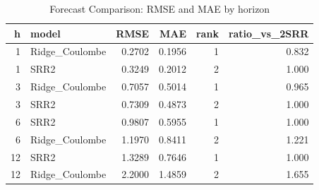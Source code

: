 \begin{table}[ht]
\centering
\caption{Forecast Comparison: RMSE and MAE by horizon} 
\label{tab:forecast_comparison}
\begin{tabular}{rlrrrr}
  \toprule
h & model & RMSE & MAE & rank & ratio\_vs\_2SRR \\ 
  \midrule
1 & Ridge\_Coulombe & 0.2702 & 0.1956 & 1 & 0.832 \\ 
  1 & SRR2 & 0.3249 & 0.2012 & 2 & 1.000 \\ 
  3 & Ridge\_Coulombe & 0.7057 & 0.5014 & 1 & 0.965 \\ 
  3 & SRR2 & 0.7309 & 0.4873 & 2 & 1.000 \\ 
  6 & SRR2 & 0.9807 & 0.5955 & 1 & 1.000 \\ 
  6 & Ridge\_Coulombe & 1.1970 & 0.8411 & 2 & 1.221 \\ 
  12 & SRR2 & 1.3289 & 0.7646 & 1 & 1.000 \\ 
  12 & Ridge\_Coulombe & 2.2000 & 1.4859 & 2 & 1.655 \\ 
   \bottomrule
\end{tabular}
\end{table}
